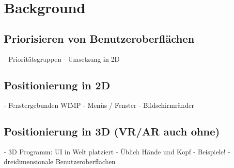 
\chapter{Background}\label{chapter:background}


	
		
		
		
		
		
	\section{Priorisieren von Benutzeroberflächen}
	- Prioritätsgruppen
	- Umsetzung in 2D
		
	\section{Positionierung in 2D}
	- Fenstergebunden WIMP
	- Menüs / Fenster
	- Bildschirmränder
		
	\section{Positionierung in 3D (VR/AR auch ohne)}
	- 3D Programm: UI in Welt platziert
	- Üblich Hände und Kopf 
	- Beispiele!
	- dreidimensionale Benutzeroberflächen